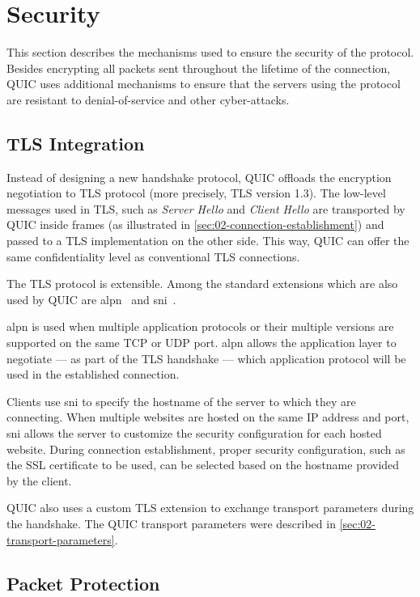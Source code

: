 \section{Security}

This section describes the mechanisms used to ensure the security of the protocol. Besides
encrypting all packets sent throughout the lifetime of the connection, QUIC uses additional
mechanisms to ensure that the servers using the protocol are resistant to denial-of-service and
other cyber-attacks.

\subsection{TLS Integration}

Instead of designing a new handshake protocol, QUIC offloads the encryption negotiation to TLS
protocol (more precisely, TLS version 1.3). The low-level messages used in TLS, such as
\textit{Server Hello} and \textit{Client Hello} are transported by QUIC inside \CRYPTO{} frames (as
illustrated in \autoref{sec:02-connection-establishment}) and passed to a TLS implementation on the
other side. This way, QUIC can offer the same confidentiality level as conventional TLS connections.

The TLS protocol is extensible. Among the standard extensions which are also used by QUIC are
\gls{alpn}~\cite{rfc7301} and \gls{sni}~\cite{rfc6066}.

\Gls{alpn} is used when multiple application protocols or their multiple versions are supported on
the same TCP or UDP port. \Gls{alpn} allows the application layer to negotiate --- as part of the
TLS handshake --- which application protocol will be used in the established connection.

Clients use \gls{sni} to specify the hostname of the server to which they are connecting. When
multiple websites are hosted on the same IP address and port, \gls{sni} allows the server to
customize the security configuration for each hosted website. During connection establishment,
proper security configuration, such as the SSL certificate to be used, can be selected based on the
hostname provided by the client.

QUIC also uses a custom TLS extension to exchange transport parameters during the handshake. The
QUIC transport parameters were described in \autoref{sec:02-transport-parameters}.

\subsection{Packet Protection}\label{sec:02-packet-protection}


